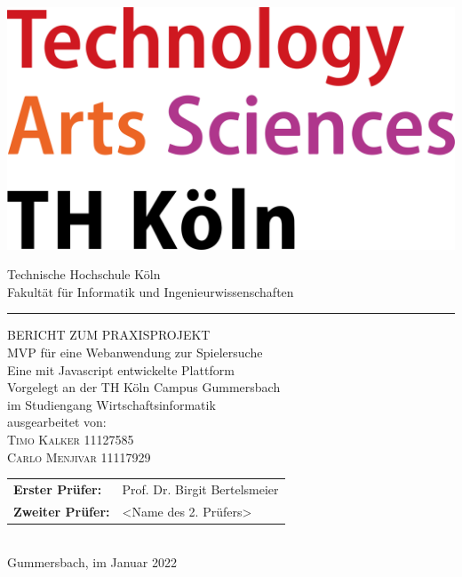 \documentclass[a4paper,12pt,oneside]{article}
\begin{document}
\pagestyle{empty} %
\newpage %

\pagestyle{empty}
\begin{titlepage}
  \includegraphics[scale=0.20]{sources/TH_Koeln_Logo}\\
  \begin{center}
    \Large
    Technische Hochschule Köln\\
    Fakultät für Informatik und Ingenieurwissenschaften\\
    \hrule\par\rule{0pt}{2cm}
    \LARGE
    \textsc{BERICHT ZUM PRAXISPROJEKT}\\
    \vspace{0.8cm}
    \huge
    MVP für eine Webanwendung zur Spielersuche\\ 
    \Large
    Eine mit Javascript entwickelte Plattform \\
    \vspace{0.8cm}
    \large
    Vorgelegt an der TH Köln Campus Gummersbach\\
    im Studiengang Wirtschaftsinformatik\\
    \vspace{0.8cm}
    ausgearbeitet von:\\
    \textsc{Timo Kalker} 11127585\\
    \textsc{Carlo Menjivar} 11117929\\
    \vspace{1cm}
    \begin{tabular}{ll} %
      \textbf{Erster Prüfer:}  & Prof. Dr. Birgit Bertelsmeier \\
      \textbf{Zweiter Prüfer:} & <Name des 2. Prüfers> \\
    \end{tabular}
    \vspace{0.5cm}
    \\Gummersbach, im Januar 2022
  \end{center}
\end{titlepage}
\end{document}
